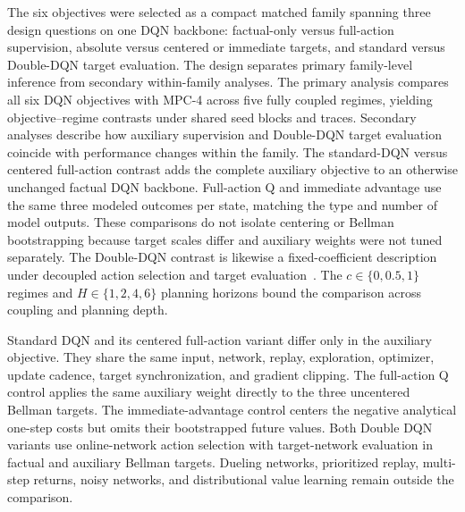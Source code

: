 \documentclass[remotesensing,article,submit,moreauthors]{Definitions/mdpi}
\newenvironment{revisedblock}{\color{red}}{}
\newenvironment{revisedblock}{}{}
\begin{document}
\begin{revisedblock}
The six objectives were selected as a compact matched family spanning three design questions on one DQN backbone: factual-only versus full-action supervision, absolute versus centered or immediate targets, and standard versus Double-DQN target evaluation. The design separates primary family-level inference from secondary within-family analyses. The primary analysis compares all six DQN objectives with MPC-4 across five fully coupled regimes, yielding \DQNvsMPCContrastCount{} objective--regime contrasts under shared seed blocks and traces. Secondary analyses describe how auxiliary supervision and Double-DQN target evaluation coincide with performance changes within the family. The standard-DQN versus centered full-action contrast adds the complete auxiliary objective to an otherwise unchanged factual DQN backbone. Full-action Q and immediate advantage use the same three modeled outcomes per state, matching the type and number of model outputs. These comparisons do not isolate centering or Bellman bootstrapping because target scales differ and auxiliary weights were not tuned separately. The Double-DQN contrast is likewise a fixed-coefficient description under decoupled action selection and target evaluation~\cite{vanhasselt2016double}. The $c\in\{0,0.5,1\}$ regimes and $H\in\{1,2,4,6\}$ planning horizons bound the comparison across coupling and planning depth.
\end{revisedblock}

Standard DQN and its centered full-action variant differ only in the auxiliary objective. They share the same input, network, replay, exploration, optimizer, update cadence, target synchronization, and gradient clipping. The full-action Q control applies the same auxiliary weight directly to the three uncentered Bellman targets. The immediate-advantage control centers the negative analytical one-step costs but omits their bootstrapped future values. Both Double DQN variants use online-network action selection with target-network evaluation in factual and auxiliary Bellman targets. Dueling networks, prioritized replay, multi-step returns, noisy networks, and distributional value learning remain outside the comparison.
\end{document}
